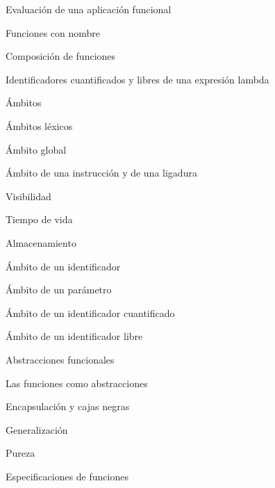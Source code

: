 \begin{longenum}
\begin{longenum}
\begin{longenum}
            \begin{longenum}
                \item Evaluación de una aplicación funcional
                \item Funciones con nombre
                \item Composición de funciones
            \end{longenum}
            \item Identificadores cuantificados y libres de una expresión lambda
        \end{longenum}
        \item Ámbitos
        \begin{longenum}
            \item Ámbitos léxicos
            \begin{longenum}
                \item Ámbito global
            \end{longenum}
            \item Ámbito de una instrucción y de una ligadura
            \begin{longenum}
                \item Visibilidad
                \item Tiempo de vida
                \item Almacenamiento
            \end{longenum}
            \item Ámbito de un identificador
            \item Ámbito de un parámetro
            \item Ámbito de un identificador cuantificado
            \item Ámbito de un identificador libre
        \end{longenum}
        \item Abstracciones funcionales
        \begin{longenum}
            \item Las funciones como abstracciones
            \begin{longenum}
                \item Encapsulación y cajas negras
                \item Generalización
            \end{longenum}
            \item Pureza
            \item Especificaciones de funciones
        \end{longenum}

\end{longenum}
\end{longenum}
